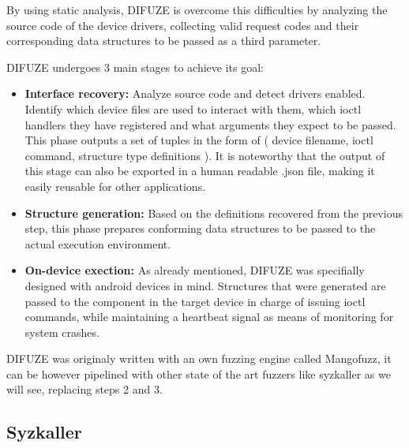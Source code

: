 By using static analysis, DIFUZE is overcome this difficulties by analyzing the source code of the device drivers,
collecting valid request codes and their corresponding data structures to be passed as a third parameter.

DIFUZE undergoes 3 main stages to achieve its goal:

\begin{itemize}
  \item \textbf{Interface recovery:} Analyze source code and detect drivers enabled. Identify which device files are used to interact with them, which ioctl handlers they have registered and what arguments they expect to be passed. This phase outputs a set of tuples in the form of ( device filename, ioctl command, structure type definitions ). It is noteworthy that the output of this stage can also be exported in a human readable .json file, making it easily reusable for other applications.
  \item \textbf{Structure generation:} Based on the definitions recovered from the previous step, this phase prepares conforming data structures to be passed to the actual execution environment.
  \item \textbf{On-device exection:} As already mentioned, DIFUZE was specifially designed with android devices in mind. Structures that were generated are passed to the component in the target device in charge of issuing ioctl commands, while maintaining a heartbeat signal as means of monitoring for system crashes.
\end{itemize}

DIFUZE was originaly written with an own fuzzing engine called Mangofuzz, it can be however pipelined with other state of the art fuzzers like syzkaller as we will see, replacing steps 2 and 3.


\subsection{Syzkaller}


